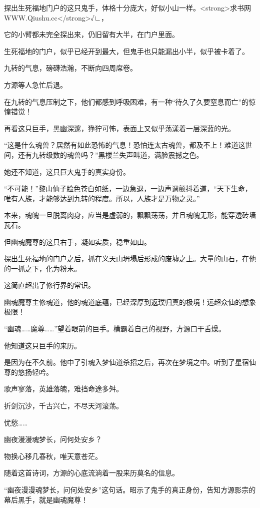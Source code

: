 
\begin{this_body}

探出生死福地门户的这只鬼手，体格十分庞大，好似小山一样。<strong>求书网WWW.Qiushu.cc</strong>√∟，

它的小臂都未完全探出来，仍旧留有大半，在门户里面。

生死福地的门户，似乎已经开到最大，但鬼手也只能漏出小半，似乎被卡着了。

九转的气息，磅礴浩瀚，不断向四周席卷。

方源等人急忙后退。

在九转的气息压制之下，他们都感到呼吸困难，有一种“待久了久要窒息而亡”的惊惶错觉！

再看这只巨手，黑幽深邃，狰狞可怖，表面上又似乎荡漾着一层深蓝的光。

“这是什么魂兽？居然有如此恐怖的气息！恐怕连太古魂兽，都及不上！难道这世间，还有九转级数的魂兽吗？”黑楼兰失声叫道，满脸震撼之色。

她还不知道，这只巨大鬼手的真实身份。

“不可能！”黎山仙子脸色苍白如纸，一边急退，一边声调颤抖着道，“天下生命，唯有人族，才能够达到九转的程度。所以，人族才是万物之灵。”

本来，魂魄一旦脱离肉身，应当是虚弱的，飘飘荡荡，并且魂魄无形，能穿透砖墙瓦石。

但幽魂魔尊的这只右手，凝如实质，稳重如山。

探出生死福地的门户之后，抓在义天山坍塌后形成的废墟之上。大量的山石，在他的一抓之下，化为粉末。

这简直超出了修行界的常识。

幽魂魔尊主修魂道，他的魂道底蕴，已经深厚到返璞归真的极境！远超众仙的想象极限！

“幽魂……魔尊……”望着眼前的巨手。横霸着自己的视野，方源口干舌燥。

他知道这只巨手的来历。

是因为在不久前。他中了引魂入梦仙道杀招之后，再次在梦境之中。听到了星宿仙尊的悠扬轻吟。

歌声寥落，英雄落魄，难挡命途多舛。

折剑沉沙，千古兴亡，不尽天河滚荡。

忧愁……

幽夜漫漫魂梦长，问何处安乡？

物换心移几春秋，唯天意苍茫。

随着这首诗词，方源的心底流淌着一股来历莫名的信息。

“幽夜漫漫魂梦长，问何处安乡”这句话。昭示了鬼手的真正身份，告知方源影宗的幕后黑手，就是幽魂魔尊！


\end{this_body}
